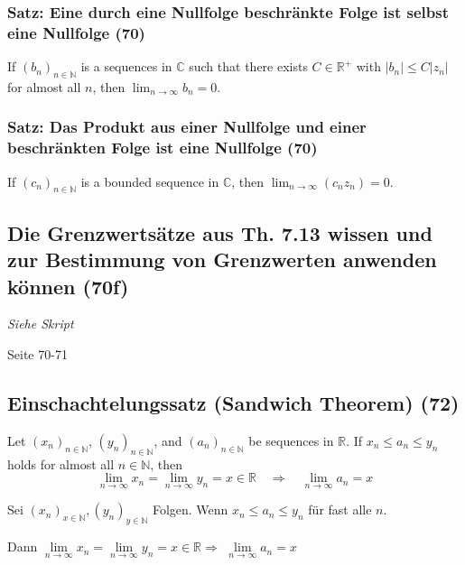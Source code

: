 \subsubsection{Satz: Eine durch eine Nullfolge beschränkte Folge ist selbst eine Nullfolge (70)}
If $(b _ { n }) _ { n \in \mathbb { N } }$ is a sequences in $\mathbb{C}$ such that there exists $C \in \mathbb { R } ^ { + }$ with $| b _ { n } | \leq C | z _ { n } |$ for
almost all $n$, then $\lim _ { n \rightarrow \infty } b _ { n } = 0$.

\subsubsection{Satz: Das Produkt aus einer Nullfolge und einer beschränkten Folge ist eine Nullfolge (70)}
If $(c _ { n }) _ { n \in \mathbb { N } }$ is a bounded sequence in $\mathbb{C}$, then $\lim _ { n \rightarrow \infty } (c_n z_n) = 0$.

\subsection{Die Grenzwertsätze aus Th. 7.13 wissen und zur Bestimmung von Grenzwerten anwenden können (70f)}
\textit{Siehe Skript} \newline
\begin{leftbar}
Seite 70-71
\end{leftbar}

\subsection{Einschachtelungssatz (Sandwich Theorem) (72)}
Let $(x _ { n }) _ { n \in \mathbb { N } }$, $(y _ { n }) _ { n \in \mathbb { N } }$, and $(a _ { n }) _ { n \in \mathbb { N } }$ be sequences in $\mathbb{R}$. If $x _ { n } \leq a _ { n } \leq y _ { n }$ holds for almost all $n \in \mathbb { N }$, then
\begin{equation}
\lim _ { n \rightarrow \infty } x _ { n } = \lim _ { n \rightarrow \infty } y _ { n } = x \in \mathbb { R } \quad \Rightarrow \quad \lim _ { n \rightarrow \infty } a _ { n } = x
\end{equation} \newline
\begin{leftbar}
Sei $(x_n)_{x \in \mathbb{N}}, (y_n)_{y \in \mathbb{N}}$ Folgen. Wenn $x_n \leq a_n \leq y_n$ für fast alle $n$.

Dann $\lim\limits_{n \rightarrow \infty}{x_n} = \lim\limits_{n \rightarrow \infty}{y_n} = x \in \mathbb{R} \Rightarrow$
$\lim\limits_{n \rightarrow \infty}{a_n} = x$
\end{leftbar}

